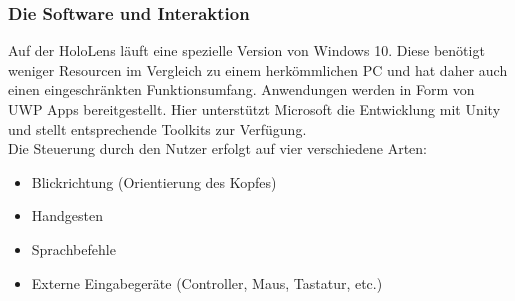 \subsubsection{Die Software und Interaktion}
\label{sec-2-1-3}
Auf der HoloLens läuft eine spezielle Version von Windows 10. Diese benötigt weniger Resourcen im Vergleich zu einem herkömmlichen PC und hat daher auch einen eingeschränkten Funktionsumfang. Anwendungen werden in Form von UWP Apps bereitgestellt. Hier unterstützt Microsoft die Entwicklung mit Unity und stellt entsprechende Toolkits zur Verfügung.\\

Die Steuerung durch den Nutzer erfolgt auf vier verschiedene Arten:
\begin{itemize}[topsep=-2px]
	\setlength{\itemsep}{-1pt}
	\singlespacing
	\item Blickrichtung (Orientierung des Kopfes)
	\item Handgesten
	\item Sprachbefehle
	\item Externe Eingabegeräte (Controller, Maus, Tastatur, etc.)
\end{itemize}
\vspace{6px}

